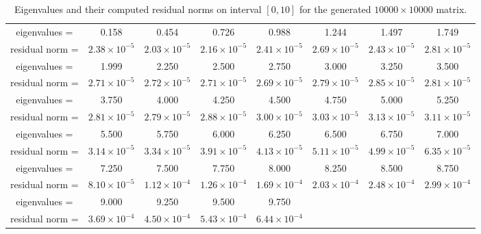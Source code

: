\begin{table*}
\begin{center}
\begin{tabular}{|c|c|c|c|c|c|c|c|}
\hline
eigenvalues =  & 0.158 & 0.454 & 0.726& 0.988 &1.244 &1.497& 1.749 \\ 
residual norm =  & $2.38\times10^{-5}$ & $2.03\times10^{-5}$ & $2.16\times10^{-5}$ & $2.41\times10^{-5}$ & $2.69\times10^{-5}$ & $2.43\times10^{-5}$ & $2.81\times10^{-5}$\\
\hline
\hline
eigenvalues = &1.999 & 2.250 & 2.500 & 2.750 & 3.000& 3.250& 3.500\\
residual norm =  &$2.71\times10^{-5}$ & $2.72\times10^{-5}$& $2.71\times10^{-5}$ &$2.69\times10^{-5}$ & $2.79\times10^{-5}$ &$2.85\times10^{-5}$&  $2.81\times10^{-5}$ \\
\hline
\hline
eigenvalues = &3.750 & 4.000 &4.250 & 4.500 & 4.750 & 5.000 & 5.250 \\
residual norm =  &$2.81\times10^{-5}$ & $2.79\times10^{-5}$ & $2.88\times10^{-5}$ & $3.00\times10^{-5}$ & $3.03\times10^{-5}$ & $3.13\times10^{-5}$ &$3.11\times10^{-5}$ \\
\hline
\hline
eigenvalues = &  5.500  & 5.750  & 6.000  & 6.250 & 6.500 & 6.750 & 7.000\\
residual norm = & $3.14\times10^{-5}$ &$3.34\times10^{-5}$ & $3.91\times10^{-5}$ & $4.13\times10^{-5}$ & $5.11\times10^{-5}$ & $4.99\times10^{-5}$ & $6.35\times10^{-5}$ \\
\hline
\hline
eigenvalues =  & 7.250 & 7.500 & 7.750 & 8.000 & 8.250 & 8.500 & 8.750   \\
residual norm = & $8.10\times10^{-5}$ & $1.12\times10^{-4}$ & $1.26\times10^{-4}$ & $1.69\times10^{-4}$ & $2.03\times10^{-4}$ & $2.48\times10^{-4}$&  $2.99\times10^{-4}$ \\
\hline
\hline
eigenvalues =  & 9.000 & 9.250 & 9.500 & 9.750 &&&\\
residual norm = & $3.69\times10^{-4}$ &$4.50\times10^{-4}$ & $5.43\times10^{-4}$ & $6.44\times10^{-4}$&&&\\
\hline
\end{tabular}
\caption{Eigenvalues and their computed residual norms on interval $[0, 10]$ for the generated $10000 \times 10000$ matrix.}
\label{tab:eigs}
\end{center}
\end{table*}

